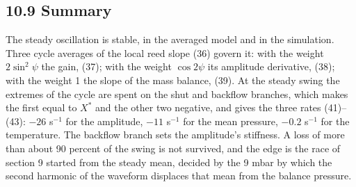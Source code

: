 \subsection*{10.9 Summary}

The steady oscillation is stable, in the averaged model and in the simulation. Three cycle averages of the local reed slope (36) govern it: with the weight $2\sin^2\psi$ the gain, (37); with the weight $\cos 2\psi$ its amplitude derivative, (38); with the weight 1 the slope of the mass balance, (39). At the steady swing the extremes of the cycle are spent on the shut and backflow branches, which makes the first equal to $X^*$ and the other two negative, and gives the three rates (41)--(43): $-26$ s$^{-1}$ for the amplitude, $-11$ s$^{-1}$ for the mean pressure, $-0.2$ s$^{-1}$ for the temperature. The backflow branch sets the amplitude's stiffness. A loss of more than about 90 percent of the swing is not survived, and the edge is the race of section 9 started from the steady mean, decided by the 9 mbar by which the second harmonic of the waveform displaces that mean from the balance pressure.
